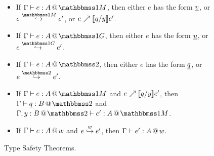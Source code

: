 
\begin{figure}
\begin{abstrsyn}





\begin{theorem} [Progress] \leavevmode
\label{thm:progress} 
\begin{itemize} 
\item If $\typesone e A$, then either $e$ has the form $\underline{v}$, or $\stepmix e {e'}$, or ${e}\nearrow \llbracket q/y \rrbracket{e'}$.
\item If $\typespure e A$, then either $e$ has the form $\underline{u}$, or $\steppure e {e'}$.
\item If $\typestwo e A$, then either $e$ has the form $\underline{q}$, or $\steptwo e {e'}$.
\end{itemize}
\end{theorem}
\begin{theorem} [Preservation] \leavevmode
\label{thm:preservation} 
\begin{itemize} 
\item If $\typesone e A$ and ${e}\nearrow \llbracket q/y \rrbracket{e'}$, then $\typestwo q B$ and $\typesone [\Gamma,\coltwo y B] {e'} A$.
\item If $\Gamma{} \vdash {e}:{A}~\hspace{-0.15em}\text{@}\hspace{-0.2em}~w$ and ${e}\overset{w}\hookrightarrow {e'}$, then $\Gamma{} \vdash {e'}:{A}~\hspace{-0.15em}\text{@}\hspace{-0.2em}~w$.
\end{itemize}
\end{theorem}

\end{abstrsyn}
\caption{Type Safety Theorems.}
\label{fig:typeSafety}
\end{figure}

